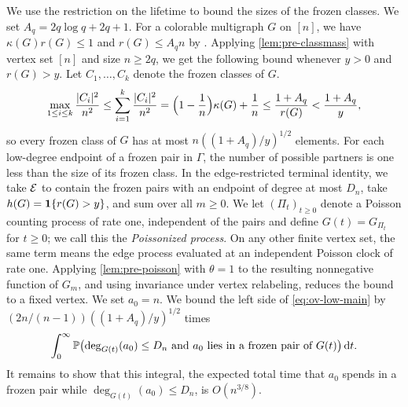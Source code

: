 We use the restriction on the lifetime to bound the sizes of the frozen classes. We set $A_q = 2q\log q + 2q + 1$. For a colorable multigraph $G$ on $[n]$, we have $\kappa(G)r(G) \le 1$ and $r(G) \le A_qn$ by . Applying \cref{lem:pre-classmass} with vertex set $[n]$ and size $n \ge 2q$, we get the following bound whenever $y > 0$ and $r(G) > y$. Let $C_1, \dots, C_k$ denote the frozen classes of $G$.
\begin{equation}\label{eq:ov-classmass}
\max_{1 \le i \le k} \frac{|C_i|^2}{n^2} \le \sum_{i = 1}^k \frac{|C_i|^2}{n^2} = \Bigl(1 - \frac{1}{n}\Bigr) \kappa(G) + \frac{1}{n} \le \frac{1 + A_q}{r(G)} < \frac{1 + A_q}{y},
\end{equation}
so every frozen class of $G$ has at most $n((1 + A_q)/y)^{1/2}$ elements. For each low-degree endpoint of a frozen pair in $\Gamma$, the number of possible partners is one less than the size of its frozen class. In the edge-restricted terminal identity, we take $\mathcal E$ to contain the frozen pairs with an endpoint of degree at most $D_n$, take $h(G) = \mathbf 1\{r(G) > y\}$, and sum over all $m \ge 0$. We let $(\Pi_t)_{t \ge 0}$ denote a Poisson counting process of rate one, independent of the pairs and define $G(t) = G_{\Pi_t}$ for $t \ge 0$; we call this the \emph{Poissonized process}. On any other finite vertex set, the same term means the edge process evaluated at an independent Poisson clock of rate one. Applying \cref{lem:pre-poisson} with $\theta = 1$ to the resulting nonnegative function of $G_m$, and using invariance under vertex relabeling, reduces the bound to a fixed vertex. We set $a_0 = n$. We bound the left side of \eqref{eq:ov-low-main} by $(2n/(n - 1))((1 + A_q)/y)^{1/2}$ times
\begin{equation}\label{eq:ov-low-occupation}
\int_0^\infty \mathbb P\bigl(\deg_{G(t)}(a_0) \le D_n \text{ and } a_0 \text{ lies in a frozen pair of } G(t)\bigr) \,\mathrm d t.
\end{equation}
It remains to show that this integral, the expected total time that $a_0$ spends in a frozen pair while $\deg_{G(t)}(a_0) \le D_n$, is $O(n^{3/8})$.

